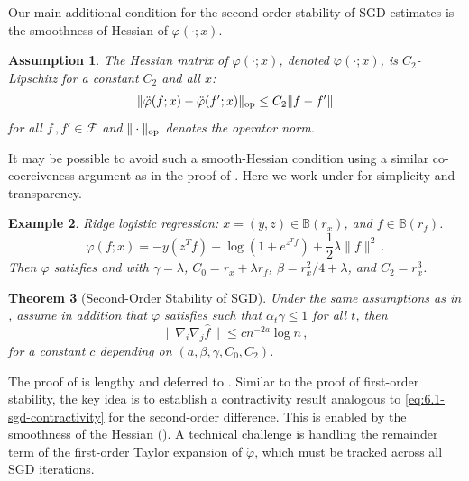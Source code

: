 \documentclass[11pt]{article}
\theoremstyle{plain}
\newtheorem{theorem}{Theorem}[section]
\newtheorem{example}[theorem]{Example}
\newtheorem{assumption}[theorem]{Assumption}
\begin{document}
Our main additional condition for the second-order stability of SGD estimates is the smoothness of Hessian of $\varphi(\cdot;x)$.
\begin{assumption}\label{asm:6.2-smooth-hessian}
 The Hessian matrix of $\varphi(\cdot;x)$, denoted $\ddot\varphi(\cdot;x)$, is $C_2$-Lipschitz for a constant $C_2$ and all $x$:
 $$
 \|\ddot\varphi(f;x)-\ddot\varphi(f';x)\|_{\rm op}\le C_2\|f-f'\|
 $$
 for all $f\,,f'\in \mathcal F$ and $\|\cdot\|_{\rm op}$ denotes the operator norm.
\end{assumption}
It may be possible to avoid such a smooth-Hessian condition using a similar co-coerciveness argument as in the proof of .  Here we work under  for simplicity and transparency.

\begin{example}\label{exa:6.2-hessian} Ridge logistic regression: $x=(y,z)\in \mathbb B(r_x)$, and $ f\in \mathbb B(r_f)$.
$$\varphi( f;x)=-y (z^T f)+\log(1+e^{z^T f})+\frac{1}{2}\lambda\| f\|^2\,.$$
Then $\varphi$ satisfies  and  with $\gamma=\lambda$, $C_0=r_x+\lambda r_ f$, $\beta=r_x^2/4+\lambda$, and $C_2=r_x^3$.
\end{example}

\begin{theorem}[Second-Order Stability of SGD]\label{thm:6.2-second-order-stab-sgd}
    Under the same assumptions as in , assume in addition that $\varphi$ satisfies  such that $\alpha_t\gamma\le 1$ for all $t$, then
    $$\|\nabla_i\nabla_j\hat f\|\le cn^{-2a}\log n\,,$$
    for a constant $c$ depending on $(a,\beta,\gamma,C_0,C_2)$.
\end{theorem}
The proof of  is lengthy and deferred to . Similar to the proof of first-order stability,  the key idea is to establish a contractivity result analogous to \eqref{eq:6.1-sgd-contractivity} for the second-order difference. This is enabled by the smoothness of the Hessian ().  A technical challenge is handling the remainder term of the first-order Taylor expansion of $\dot\varphi$, which must be tracked across all SGD iterations.

\end{document}
